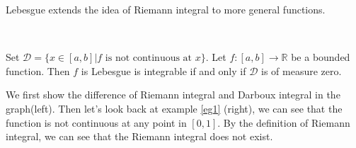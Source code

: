 Lebesgue extends the idea of Riemann integral to more general functions.
\begin{theorem}
    \

    Set $\mathcal{D} = \{ x \in [a,b] | f \text{ is not continuous at } x\}.$
    Let $f: [a, b] \to \mathbb{R}$ be a bounded function. Then $f$ is Lebesgue is integrable if and only if $\mathcal{D}$ is of measure zero.
\end{theorem}

We first show the difference of Riemann integral and Darboux integral in the graph(left).
Then let's look back at example \ref{eg1} (right), we can see that the function is not continuous at any point in $[0,1]$.
By the definition of Riemann integral, we can see that the Riemann integral does not exist.

